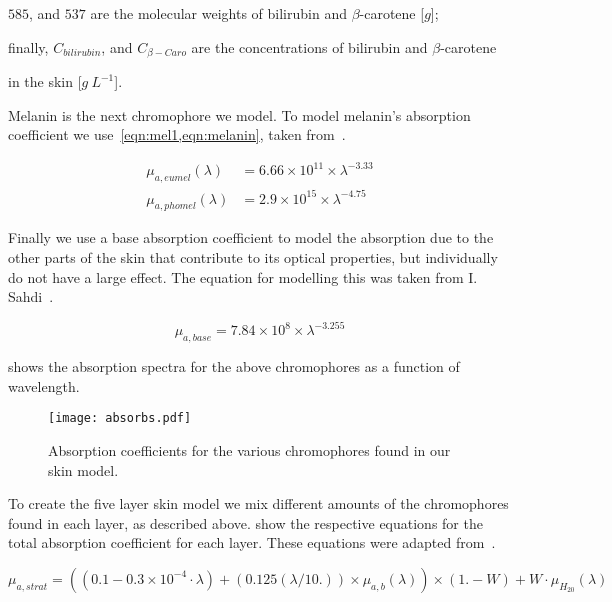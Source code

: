 \indent $585$, and $537$ are the molecular weights of bilirubin and $\beta$-carotene [$g$];

\indent finally, $C_{bilirubin}$, and $C_{\beta-Caro}$ are the concentrations of bilirubin and $\beta$-carotene 

\indent in the skin [$g\ L^{-1}$].

\medskip

Melanin is the next chromophore we model.
To model melanin's absorption coefficient we use~\cref{eqn:mel1,eqn:melanin}, taken from~\cite{iglesias2015biophysically}.

\begin{align}
\mu_{a,eumel}(\lambda)&=6.66\times10^{11} \times \lambda^{-3.33}\label{eqn:mel1}\\
\mu_{a,phomel}(\lambda)&=2.9\times10^{15} \times \lambda^{-4.75}
\label{eqn:melanin}
\end{align}

Finally we use a base absorption coefficient to model the absorption due to the other parts of the skin that contribute to its optical properties, but individually do not have a large effect.
The equation for modelling this was taken from I. Sahdi~\cite{saidi1992transcutaneous}.

\begin{equation}
\mu_{a,base}=7.84\times10^{8}\times\lambda^{-3.255}
\label{eqn:base}
\end{equation}


 shows the absorption spectra for the above chromophores as a function of wavelength.

\begin{figure}[!htpb]
	\centering
	\texttt{[image: absorbs.pdf]}
	\caption{Absorption coefficients for the various chromophores found in our skin model.}
	\label{fig:absorcoeff}
\end{figure}

To create the five layer skin model we mix different amounts of the chromophores found in each layer, as described above.
 show the respective equations for the total absorption coefficient for each layer.
These equations were adapted from~\cite{meglinski2002quantitative,iglesias2015biophysically,jacques2013optical}.

\begin{equation}
\mu_{a,strat}= ((0.1 - 0.3\times10^{-4}\cdot\lambda) + (0.125(\lambda/10.))\times \mu_{a,b}(\lambda))\times(1. - W) + W\cdot\mu_{H_20}(\lambda)
\label{eqn:stratabs}
\end{equation}

